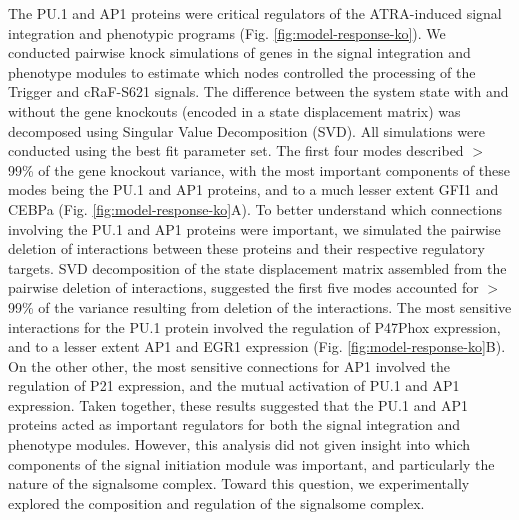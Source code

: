 \documentclass[12pt]{article}
\begin{document}

The PU.1 and AP1 proteins were critical regulators of the ATRA-induced signal integration and phenotypic programs (Fig. \ref{fig:model-response-ko}).
We conducted pairwise knock simulations of genes in the signal integration and phenotype modules to estimate which nodes controlled the processing of the Trigger and cRaF-S621 signals.
The difference between the system state with and without the gene knockouts (encoded in a state displacement matrix) was decomposed using Singular Value Decomposition (SVD).
All simulations were conducted using the best fit parameter set.
The first four modes described $>$99\% of the gene knockout variance,
with the most important components of these modes being the PU.1 and AP1 proteins, and to a much lesser extent GFI1 and CEBPa (Fig. \ref{fig:model-response-ko}A).
To better understand which connections involving the PU.1 and AP1 proteins were important, we simulated the pairwise deletion of interactions between these proteins and their respective regulatory targets.
SVD decomposition of the state displacement matrix assembled from the pairwise deletion of interactions, suggested the first five modes accounted for $>$99\% of the variance resulting from deletion of the interactions.
The most sensitive interactions for the PU.1 protein involved the regulation of P47Phox expression, and to a lesser extent AP1 and EGR1 expression (Fig. \ref{fig:model-response-ko}B).
On the other other, the most sensitive connections for AP1 involved the regulation of P21 expression, and the mutual activation of PU.1 and AP1 expression.
Taken together, these results suggested that the PU.1 and AP1 proteins acted as important regulators for both the signal integration and phenotype modules.
However, this analysis did not given insight into which components of the signal initiation module was important, and particularly the nature of the signalsome complex.
Toward this question, we experimentally explored the composition and regulation of the signalsome complex.
\end{document}

